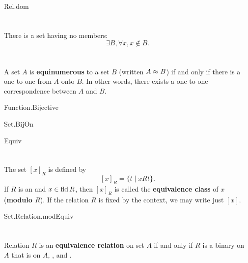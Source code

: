 \documentclass{report}
\begin{document}
    {Rel.dom}

\section{}%

  There is a set having no members: $$\exists B, \forall x, x \not\in B.$$


\section{}%

  A set $A$ is \textbf{equinumerous} to a set $B$ (written
    $A \approx B$) if and only if there is a one-to-one
     from $A$ onto $B$.
  In other words, there exists a one-to-one correspondence between $A$ and $B$.

    {Function.Bijective}

    {Set.BijOn}

    {Equiv}

\section{}%

  The set $[x]_R$ is defined by $$[x]_R = \{t \mid xRt\}.$$
  If $R$ is an  and $x \in \mathop{\text{fld}}{R}$, then
    $[x]_R$ is called the \textbf{equivalence class} of $x$
    (\textbf{modulo $R$}).
  If the relation $R$ is fixed by the context, we may write just $[x]$.

    {Set.Relation.modEquiv}

\section{}%

  Relation $R$ is an \textbf{equivalence relation} on set $A$ if and only if
    $R$ is a binary  on $A$ that is
     on $A$, , and
    .
\end{document}
